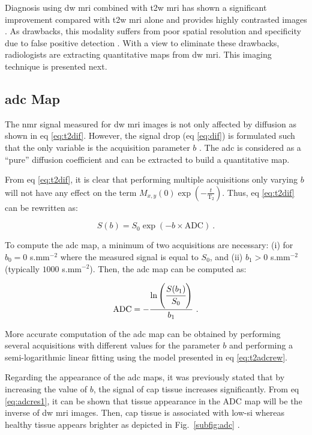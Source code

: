 Diagnosis using \ac{dw} \ac{mri} combined with \ac{t2w} \ac{mri} has shown a significant improvement compared with \ac{t2w} \ac{mri} alone and provides highly contrasted images \cite{Shimofusa2005,Padhani2011,Choi2007}.
As drawbacks, this modality suffers from poor spatial resolution and specificity due to false positive detection \cite{Choi2007}.
With a view to eliminate these drawbacks, radiologists are extracting quantitative maps from \ac{dw} \ac{mri}.
This imaging technique is presented next.

\subsection{\acs*{adc} Map}\label{subsec:chp2:imaging:adc} 
The \ac{nmr} signal measured for \ac{dw} \ac{mri} images is not only affected by diffusion as shown in \acs{eq} \eqref{eq:t2dif}.
However, the signal drop (\acs{eq} \eqref{eq:dif}) is formulated such that the only variable is the acquisition parameter $b$ \cite{LeBihan1986}.
The \ac{adc} is considered as a ``pure'' diffusion coefficient and can be extracted to build a quantitative map.

From \acs{eq} \eqref{eq:t2dif}, it is clear that performing multiple acquisitions only varying $b$ will not have any effect on the term  $M_{x,y}(0) \exp \left( - \frac{t}{\text{T}_2} \right)$.
Thus, \acs{eq} \eqref{eq:t2dif} can be rewritten as:

\begin{equation}
	S(b) = S_0 \exp \left( -b \times \text{ADC} \right) \ .
	\label{eq:t2adcrew}
\end{equation}

To compute the \ac{adc} map, a minimum of two acquisitions are necessary: (i) for $b_0=0$ s.mm$^{-2}$ where the measured signal is equal to $S_0$, and (ii) $b_1>0$ s.mm$^{-2}$ (typically $1000$ s.mm$^{-2}$).
Then, the \ac{adc} map can be computed as:

\begin{equation}
	\text{ADC} = - \frac{\ln \left( \cfrac{S(b_1)}{S_0} \right) }{b_1} \ .
	\label{eq:adcres1}
\end{equation}

More accurate computation of the \ac{adc} map can be obtained by performing several acquisitions with different values for the parameter $b$ and performing a semi-logarithmic linear fitting using the model presented in \acs{eq} \eqref{eq:t2adcrew}.

Regarding the appearance of the \ac{adc} maps, it was previously stated that by increasing the value of $b$, the signal of \ac{cap} tissue increases significantly.
From \acs{eq} \eqref{eq:adcres1}, it can be shown that tissue appearance in the ADC map will be the inverse of \ac{dw} \ac{mri} images.
Then, \ac{cap} tissue is associated with low-\ac{si} whereas healthy tissue appears brighter as depicted in Fig.~\ref{subfig:adc} \cite{Barentsz2012}.

